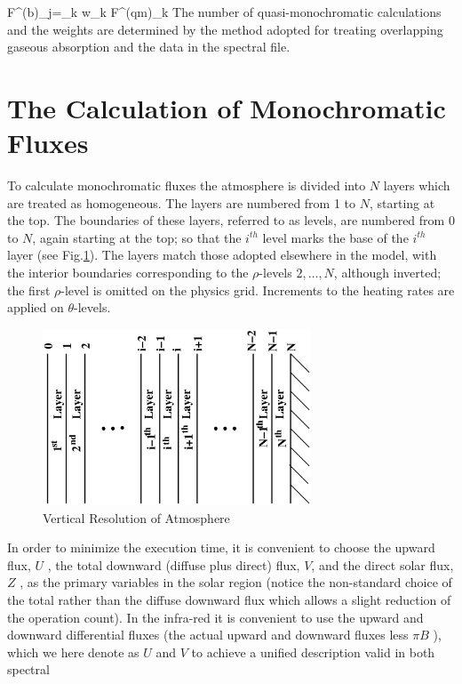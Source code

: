 \beq
F^{(b)}_{j}=\sum_{k} w_{k} F^{(qm)}_{k}
\label{p2_eq2}
\eeq 
The number of quasi-monochromatic calculations and the weights are 
determined by the method 
adopted for treating overlapping gaseous absorption and the data in 
the spectral file.

\section{The Calculation of Monochromatic Fluxes}

To calculate monochromatic fluxes the atmosphere is divided into $N$ 
layers which are treated as homogeneous. The layers are numbered from 1 
to $N$, starting at the top. The boundaries of these layers, referred to 
as levels, are numbered from 0 to $N$, again starting at the top; so that 
the $i^{th}$ level marks the base of the  $i^{th}$ layer (see Fig.\ref{CMF1}). 
The layers match those adopted elsewhere in the model, with the interior 
boundaries corresponding to the $\rho$-levels $2,\ldots, N$, although inverted;
the first $\rho$-level is omitted on the physics grid. Increments to the 
heating rates are applied on $\theta$-levels.
\begin{figure}
\begin{center}
\includegraphics[width=8.0cm,angle=270]{layer.ps}
\caption{Vertical Resolution of Atmosphere}
\label{CMF1}
\end{center}
\end{figure}
\noindent
In order to minimize the execution time, it is convenient to choose the 
upward flux, $U$ , the total downward (diffuse plus direct) flux, $V$, 
and the direct solar flux, $Z$  , as the primary variables in the solar region 
(notice the non-standard choice of the total rather than the diffuse 
downward flux which allows a slight reduction of the operation count). In the 
infra-red it is convenient to use the upward and downward differential 
fluxes (the actual upward and downward fluxes less $\pi B$ ), which we here 
denote as $U$  and $V$  to achieve a unified description valid in both spectral 
